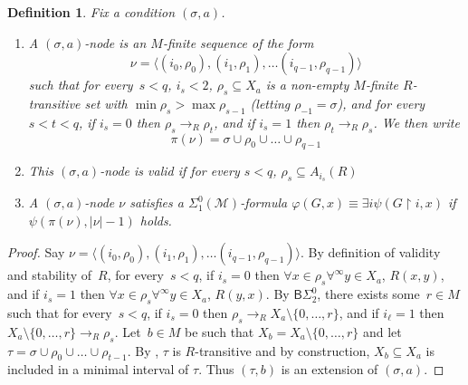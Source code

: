 \documentclass{article}
\numberwithin{theorem}{section}
\newtheorem{lemma}[theorem]{Lemma}
\newtheorem{definition}[theorem]{Definition}
\newcommand{\BSig}{\mathsf{B}\Sigma^0}
\newcommand{\M}{\mathcal{M}}
\newcommand{\uh}[0]{{\upharpoonright}}
\begin{document}
\begin{definition}
Fix a condition $(\sigma, a)$.
\begin{enumerate}
    \item[(1)] A \emph{$(\sigma, a)$-node} is an $M$-finite sequence of the form
$$\nu = \langle (i_0, \rho_0), (i_1, \rho_1), \dots (i_{q-1}, \rho_{q-1}) \rangle$$ such that for every~$s < q$, $i_s < 2$, $\rho_s \subseteq X_a$ is a non-empty $M$-finite $R$-transitive set with $\min \rho_s > \max \rho_{s-1}$ (letting $\rho_{-1} = \sigma$), and for every~$s < t < q$, if $i_s = 0$ then $\rho_s \to_R \rho_t$, and if $i_s = 1$ then $\rho_t \to_R \rho_s$.
We then write $$\pi(\nu) = \sigma \cup \rho_0 \cup \dots \cup \rho_{q-1}$$
    \item[(2)] This $(\sigma, a)$-node is \emph{valid} if for every $s < q$, $\rho_s \subseteq A_{i_s}(R)$
    \item[(3)] A $(\sigma, a)$-node $\nu$ \emph{satisfies} a $\Sigma^0_1(\M)$-formula $\varphi(G, x) \equiv \exists i \psi(G \uh i, x)$  if $\psi(\pi(\nu), |\nu|-1)$ holds.
\end{enumerate}
\end{definition}



\begin{proof}
Say $\nu = \langle (i_0, \rho_0), (i_1, \rho_1), \dots (i_{q-1}, \rho_{q-1}) \rangle$.
By definition of validity and stability of~$R$, for every~$s < q$, if $i_s = 0$ then $\forall x \in \rho_s \forall^\infty y \in X_a$, $R(x, y)$, and if $i_s = 1$ then $\forall x \in \rho_s \forall^\infty y \in X_a$, $R(y, x)$.
By $\BSig_2$, there exists some~$r \in M$ such that for every~$s < q$, if $i_s = 0$ then $\rho_s \to_R X_a \setminus \{0, \dots, r\}$, and if $i_\ell = 1$ then $X_a \setminus \{0, \dots, r\} \to_R \rho_s$. Let~$b \in M$ be such that $X_b = X_a \setminus \{0, \dots, r\}$ and let~$\tau = \sigma \cup \rho_0 \cup \dots \cup \rho_{t-1}$.
By , $\tau$ is $R$-transitive and by construction, $X_b \subseteq X_a$ is included in a minimal interval of $\tau$. Thus $(\tau, b)$ is an extension of $(\sigma, a)$.
\end{proof}
\end{document}

